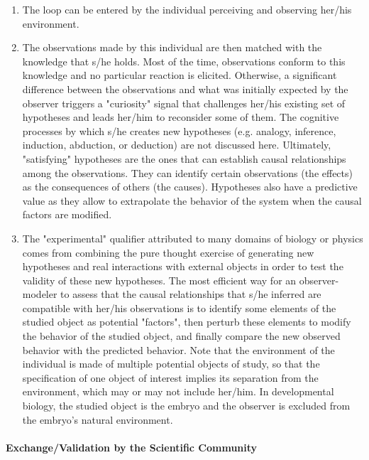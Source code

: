 \begin{enumerate}
	\item The loop can be entered by the individual perceiving and observing her/his environment.
	\item The observations made by this individual are then matched with the knowledge that s/he holds. Most of the time, observations conform to this knowledge and no particular reaction is elicited. Otherwise, a significant difference between the observations and what was initially expected by the observer triggers a "curiosity" signal that challenges her/his existing set of hypotheses and leads her/him to reconsider some of them. The cognitive processes by which s/he creates new hypotheses (e.g. analogy, inference, induction, abduction, or deduction) are not discussed here. Ultimately, "satisfying" hypotheses are the ones that can establish causal relationships among the observations. They can identify certain observations (the effects) as the consequences of others (the causes). Hypotheses also have a predictive value as they allow to extrapolate the behavior of the system when the causal factors are modified.
	\item The "experimental" qualifier attributed to many domains of biology or physics comes from combining the pure thought exercise of generating new hypotheses and real interactions with external objects in order to test the validity of these new hypotheses. The most efficient way for an observer-modeler to assess that the causal relationships that s/he inferred are compatible with her/his observations is to identify some elements of the studied object as potential "factors", then perturb these elements to modify the behavior of the studied object, and finally compare the new observed behavior with the predicted behavior. Note that the environment of the individual is made of multiple potential objects of study, so that the specification of one object of interest implies its separation from the environment, which may or may not include her/him. In developmental biology, the studied object is the embryo and the observer is excluded from the embryo's natural environment.
\end{enumerate}

\paragraph{Exchange/Validation by the Scientific Community}


